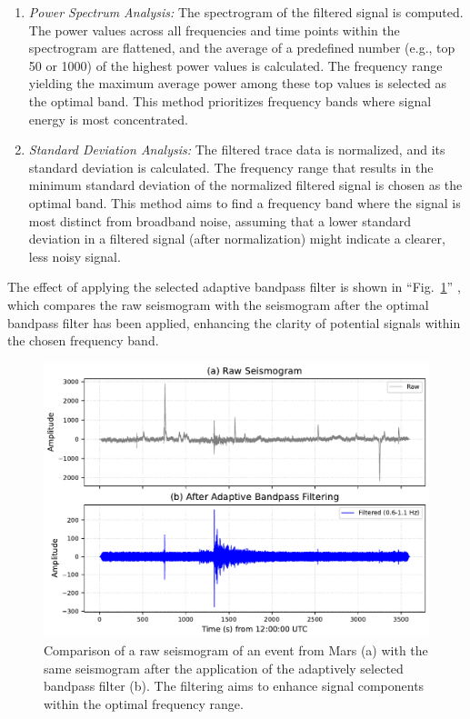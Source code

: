 \documentclass[conference]{IEEEtran}
\begin{document}
            \begin{enumerate}[label=\alph*), leftmargin=3em]
                \item \textit{Power Spectrum Analysis:} The spectrogram of the filtered signal is computed.
                The power values across all frequencies and time points within the spectrogram are flattened, and the average of
                a predefined number (e.g., top 50 or 1000) of the highest power values is calculated. The frequency range
                yielding the maximum average power among these top values is selected as the optimal band. This method
                prioritizes frequency bands where signal energy is most concentrated.
                \item \textit{Standard Deviation Analysis:} The filtered trace data is normalized, and its
                standard deviation is calculated. The frequency range that results in the minimum standard deviation of the
                normalized filtered signal is chosen as the optimal band. This method aims to find a frequency band where the
                signal is most distinct from broadband noise, assuming that a lower standard deviation in a filtered signal
                (after normalization) might indicate a clearer, less noisy signal.
            \end{enumerate}

            The effect of applying the selected adaptive bandpass filter is shown in ``Fig.~\ref{fig:adaptive_filtering_comparison}''
            , which compares the raw seismogram with the seismogram after the optimal bandpass filter has been applied, 
            enhancing the clarity of potential signals within the chosen frequency band.
            \begin{figure}[htbp]
                \centerline{\includegraphics[width=0.9\columnwidth]{figures/fig2_adaptive_bandpass.pdf}}
                \caption{Comparison of a raw seismogram of an event from Mars (a) with the same seismogram after the application 
                of the adaptively selected bandpass filter (b). The filtering aims to enhance signal 
                components within the optimal frequency range.}
                \label{fig:adaptive_filtering_comparison} 
            \end{figure}
\end{document}
